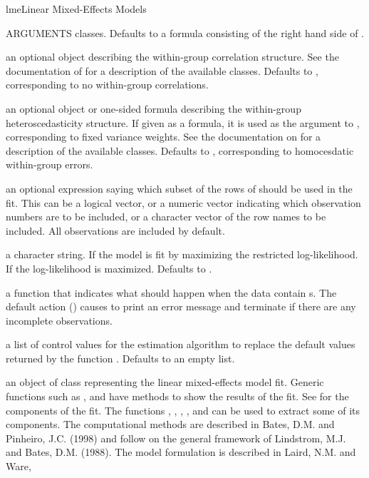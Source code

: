 \documentclass[pdftex]{article} \usepackage{url,graphicx}
\begin{document}
\begin{Helpfile}{lme}{Linear Mixed-Effects Models}
\begin{Argument}{ARGUMENTS}
 classes. Defaults to a formula consisting of the right
hand side of .
\item[\Co{correlation:}]
an optional  object describing the
within-group correlation structure. See the documentation of
 for a description of the available 
classes. Defaults to ,
corresponding to no within-group correlations.
\item[\Co{weights:}]
an optional  object or one-sided formula
describing the within-group heteroscedasticity structure. If given as
a formula, it is used as the argument to ,
corresponding to fixed variance weights. See the documentation on
 for a description of the available 
classes. Defaults to , corresponding to homocesdatic
within-group errors.
\item[\Co{subset:}]
an optional expression saying which subset of the rows of
 should  be  used in the fit. This can be a logical
vector, or a numeric vector indicating which observation numbers are
to be included, or a  character  vector of the row names to be
included.  All observations are included by default.
\item[\Co{method:}]
a character string.  If  the model is fit by
maximizing the restricted log-likelihood.  If  the
log-likelihood is maximized.  Defaults to .
\item[\Co{na.action:}]
a function that indicates what should happen when the
data contain s.  The default action () causes
 to print an error message and terminate if there are any
incomplete observations.
\item[\Co{control:}]
a list of control values for the estimation algorithm to
replace the default values returned by the function .
Defaults to an empty list.
\end{Argument}
an object of class  representing the linear mixed-effects
model fit. Generic functions such as ,  and
 have methods to show the results of the fit. See
 for the components of the fit. The functions
, , , , and
  can be used to extract some of its components.
The computational methods are described in Bates, D.M. and Pinheiro, J.C.
(1998) and follow on the general framework of Lindstrom, M.J. and Bates,
D.M. (1988). The model formulation is described in Laird, N.M. and Ware,

\end{Helpfile}
\end{document}

